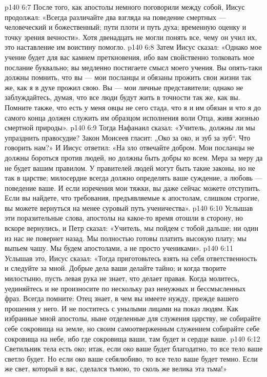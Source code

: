 \vs p140 6:7 После того, как апостолы немного поговорили между собой, Иисус продолжал: «Всегда различайте два взгляда на поведение смертных --- человеческий и божественный; пути плоти и путь духа; временную оценку и точку зрения вечности». Хотя двенадцать не могли понять все, чему он учил их, это наставление им воистину помогло.
\vs p140 6:8 Затем Иисус сказал: «Однако мое учение будет для вас камнем преткновения, ибо вам свойственно толковать мое послание буквально; вы медленно постигаете смысл моего учения. Вы опять\hyp{}таки должны помнить, что вы --- мои посланцы и обязаны прожить свои жизни так же, как я в духе прожил свою. Вы --- мои личные представители; однако не заблуждайтесь, думая, что все люди будут жить в точности так же, как вы. Помните также, что есть у меня овцы не сего стада, что я и им обязан и что я до самого конца должен служить им образцом исполнения воли Отца, живя жизнью смертной природы».
\vs p140 6:9 Тогда Нафанаил сказал: «Учитель, должны ли мы упразднить правосудие? Закон Моисеев гласит: „Око за око, и зуб за зуб“. Что говорить нам?» И Иисус ответил: «На зло отвечайте добром. Мои посланцы не должны бороться против людей, но должны быть добры ко всем. Мера за меру да не будет вашим правилом. У правителей людей могут быть такие законы, но не так в царстве; милосердие всегда должно определять ваше суждение, а любовь --- поведение ваше. И если изречения мои тяжки, вы даже сейчас можете отступить. Если вы найдете, что требования, предъявляемые к апостолам, слишком строгие, вы можете вернуться на менее суровый путь ученичества».
\vs p140 6:10 Услышав эти поразительные слова, апостолы на какое\hyp{}то время отошли в сторону, но вскоре вернулись, и Петр сказал: «Учитель, мы пойдем с тобой дальше; ни один из нас не повернет назад. Мы полностью готовы платить высокую плату; мы выпьем чашу. Мы будем апостолами, а не просто учениками».
\vs p140 6:11 Услышав это, Иисус сказал: «Тогда приготовьтесь взять на себя ответственность и следуйте за мной. Добрые дела ваши делайте тайно; и когда творите милостыню, пусть левая рука не знает, что делает правая. Когда молитесь, уединяйтесь и не произносите по нескольку раз ненужных и бессмысленных фраз. Всегда помните: Отец знает, в чем вы имеете нужду, прежде вашего прошения у него. И не поститесь с унылыми лицами на показ людям. Как избранные мной апостолы, ныне отделенные для служения царству, не собирайте себе сокровища на земле, но своим самоотверженным служением собирайте себе сокровища на небе, ибо где сокровища ваши, там будет и сердце ваше.
\vs p140 6:12 Светильник тела есть око; итак, если око ваше будет благодатно, то все тело ваше светло будет. Но если око ваше себялюбиво, то все тело ваше будет темно. Если же свет, который в вас, сделался тьмою, то сколь же велика эта тьма!»
